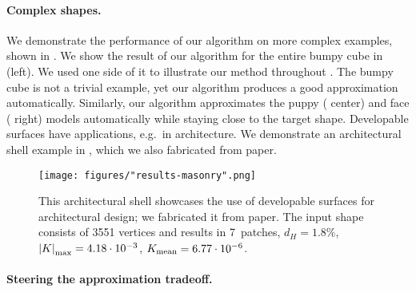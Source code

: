 \paragraph{Complex shapes.}

We demonstrate the performance of our algorithm on more complex examples, shown in . We show the result of our algorithm for the entire bumpy cube in  (left). We used one side of it to illustrate our method throughout . The bumpy cube is not a trivial example, yet our algorithm produces a good approximation automatically. Similarly, our algorithm approximates the puppy ( center) and face ( right) models automatically while staying close to the target shape. 
%
Developable surfaces have applications, e.g.\ in architecture. We demonstrate an architectural shell example in , which we also fabricated from paper.

\begin{figure}
    \centering
    \noindent\texttt{[image: figures/"results-masonry".png]}
    \caption{
        This architectural shell showcases the use of developable surfaces for architectural design; we fabricated it from paper. The input shape consists of 3551 vertices and results in 7~patches, $d_H = 1.8\%$, $ \left\vert K\right\vert_\text{max} = 4.18\cdot 10^{-3} $, $ K_\text{mean} = 6.77\cdot 10^{-6} $. 
        \label{fig:results_masonry}}
\end{figure}



\paragraph{Steering the approximation tradeoff. }

